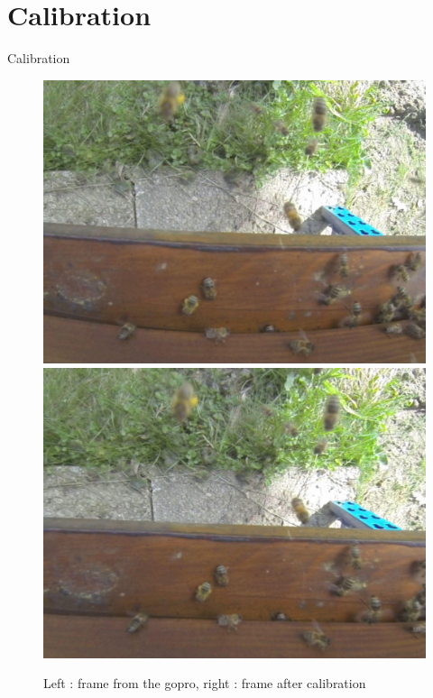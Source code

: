 \documentclass{beamer}
\begin{document}
\section{Calibration}
\begin{frame}{Calibration}
\begin{figure}
\includegraphics[scale=0.33]{pictures/Dist}
\includegraphics[scale=0.33]{pictures/Calib}
\caption{Left : frame from the gopro, right : frame after calibration}
\end{figure}
\end{frame}
\end{document}
